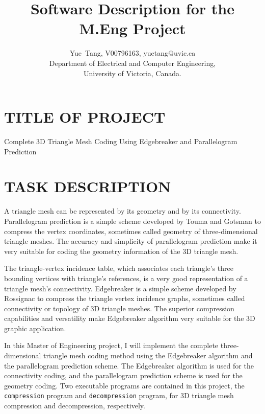 \documentclass[onecolumn, 12pt]{article}
\begin{document}
\title{Software Description for the M.Eng Project}
\author{
Yue~Tang, V00796163, yuetang@uvic.ca\\
Department of Electrical and Computer Engineering, \\
University of Victoria, Canada.
}
\maketitle



{\centering
\section*{TITLE OF PROJECT}
\begin{center}
Complete 3D Triangle Mesh Coding Using Edgebreaker and Parallelogram Prediction
\end{center}}
\newpage


\section{TASK DESCRIPTION}
A triangle mesh can be represented by its geometry and by its connectivity. Parallelogram prediction is a simple scheme developed by Touma and Gotsman \cite{Parallel} to compress the vertex coordinates, sometimes called geometry of three-dimensional triangle meshes. The accuracy and simplicity of parallelogram prediction make it very suitable for coding the geometry information of the 3D triangle mesh.

The triangle-vertex incidence table, which associates each triangle's three bounding vertices with triangle's references, is a very good representation of a triangle mesh's connectivity. Edgebreaker is a simple scheme developed by Rossignac \cite{Edgebreaker} to compress the triangle vertex incidence graphs, sometimes called connectivity or topology of 3D triangle meshes. The superior compression capabilities and versatility make Edgebreaker algorithm very suitable for the 3D graphic application.

In this Master of Engineering project, I will implement the complete three-dimensional triangle mesh coding method using the Edgebreaker algorithm and the parallelogram prediction scheme. The Edgebreaker algorithm is used for the connectivity coding, and the parallelogram prediction scheme is used for the geometry coding. Two executable programs are contained in this project, the \lstinline!compression! program and \lstinline!decompression! program, for 3D triangle mesh compression and decompression, respectively.
\end{document}

